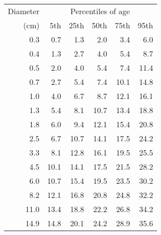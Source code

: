\begin{tabular}{|r||r|r|r|r|r|}
\hline
Diameter   & \multicolumn{5}{c|}{Percentiles of age} \\
(cm)   & 5th & 25th & 50th & 75th & 95th \\
\hline
0.3 & 0.7  & 1.3  & 2.0  & 3.4  & 6.0 \\
0.4 & 1.3  & 2.7  & 4.0  & 5.4  & 8.7 \\
0.5 & 2.0  & 4.0  & 5.4  & 7.4  & 11.4 \\
0.7 & 2.7  & 5.4  & 7.4  & 10.1  & 14.8 \\
1.0 & 4.0  & 6.7  & 8.7  & 12.1  & 16.1 \\
1.3 & 5.4  & 8.1  & 10.7  & 13.4  & 18.8 \\
1.8 & 6.0  & 9.4  & 12.1  & 15.4  & 20.8 \\
2.5 & 6.7  & 10.7  & 14.1  & 17.5  & 24.2 \\
3.3 & 8.1  & 12.8  & 16.1  & 19.5  & 25.5 \\
4.5 & 10.1  & 14.1  & 17.5  & 21.5  & 28.2 \\
6.0 & 10.7  & 15.4  & 19.5  & 23.5  & 30.2 \\
8.2 & 12.1  & 16.8  & 20.8  & 24.8  & 32.2 \\
11.0 & 13.4  & 18.8  & 22.2  & 26.8  & 34.2 \\
14.9 & 14.8  & 20.1  & 24.2  & 28.9  & 35.6 \\
\hline
\end{tabular}
